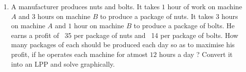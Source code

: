 \documentclass[10pt,-letter paper]{article}
\begin{document}
\begin{enumerate}
\item A manufacturer produces nuts and bolts. It takes $1$ hour of work on machine $A$ and $3$ hours on machine $B$ to produce a package of nuts. It takes $3$ hours on machine $A$ and $1$ hour on machine $B$ to produce a package of bolts. He earns a profit of \rupee~35 per package of nuts and \rupee~14 per package of bolts. How many packages of each should be produced each day so as to maximise his profit, if he operates each machine for atmost $12$ hours a day ? Convert it into an LPP and solve graphically.





\end{enumerate}
\end{document}
